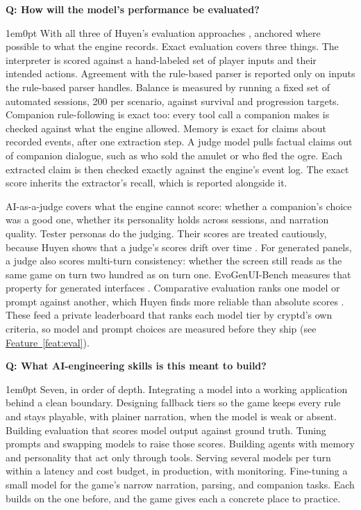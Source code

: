 \documentclass[11pt,letterpaper]{article}
\newcounter{faqnum}
\newenvironment{faqpair}[1]{%
  \needspace{4\baselineskip}\vspace{0.5em}\refstepcounter{faqnum}%
  \noindent\textbf{\color{SectionBlue}Q\thefaqnum: #1}\par\nopagebreak[4]%
  \vspace{0.2em}\begin{adjustwidth}{1em}{0pt}\setlength{\parindent}{0pt}%
}{\end{adjustwidth}\vspace{0.5em}}
\newcommand{\featureref}[1]{\hyperref[#1]{Feature~\ref*{#1}}}
\begin{document}
\begin{faqpair}{How will the model's performance be evaluated?}\label{faq:eval}
With all three of Huyen's evaluation approaches \cite{huyen2025aie},
anchored where possible to what the engine records. Exact evaluation
covers three things. The interpreter is scored against a hand-labeled set
of player inputs and their intended actions. Agreement with the rule-based
parser is reported only on inputs the rule-based parser handles. Balance is
measured by running a fixed set of automated sessions, 200 per scenario,
against survival and progression targets. Companion rule-following is exact
too: every tool call a companion makes is checked against what the engine
allowed. Memory is exact for claims about recorded events, after one
extraction step. A judge model pulls factual claims out of companion
dialogue, such as who sold the amulet or who fled the ogre. Each extracted
claim is then checked exactly against the engine's event log. The exact
score inherits the extractor's recall, which is reported alongside it.

AI-as-a-judge covers what the engine cannot score: whether a companion's
choice was a good one, whether its personality holds across sessions, and
narration quality. Tester personas do the judging. Their scores are
treated cautiously, because Huyen shows that a judge's scores drift over
time \cite{huyen2025aie}. For generated panels, a judge also scores
multi-turn consistency: whether the screen still reads as the same game on
turn two hundred as on turn one. EvoGenUI-Bench measures that property for
generated interfaces \cite{evogenuibench2026}. Comparative evaluation ranks
one model or prompt against another, which Huyen finds more reliable than
absolute scores \cite{huyen2025aie}. These feed a private leaderboard that
ranks each model tier by cryptd's own criteria, so model and prompt choices
are measured before they ship (see \featureref{feat:eval}).
\end{faqpair}

\begin{faqpair}{What AI-engineering skills is this meant to build?}\label{faq:skills}
Seven, in order of depth. Integrating a model into a working application
behind a clean boundary. Designing fallback tiers so the game keeps every
rule and stays playable, with plainer narration, when the model is weak or
absent. Building evaluation that
scores model output against ground truth. Tuning prompts and swapping
models to raise those scores. Building agents with memory and personality
that act only through tools. Serving several models per turn within a
latency and cost budget, in production, with monitoring. Fine-tuning a
small model for the game's narrow narration, parsing, and companion tasks.
Each builds on the one before, and the game gives each a concrete place to
practice.
\end{faqpair}
\end{document}
